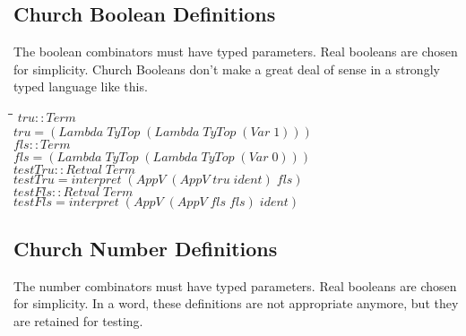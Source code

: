 \documentclass[10pt]{article}
\newlength{\lwidth}\setlength{\lwidth}{4.5cm}
\newlength{\cwidth}\setlength{\cwidth}{8mm} %
\newcommand{\Conid}[1]{\mathit{#1}}
\newcommand{\Varid}[1]{\mathit{#1}}
\begin{document}
\subsection{Church Boolean Definitions}

The boolean combinators must have typed parameters.  Real booleans are
chosen for simplicity.  Church Booleans don't make a great deal of
sense in a strongly typed language like this.

\begin{tabbing}
\qquad\=\hspace{\lwidth}\=\hspace{\cwidth}\=\+\kill
${\Varid{tru}\mathbin{::}\Conid{Term}}$\\
${\Varid{tru}\mathrel{=}(\Conid{Lambda}\;\Conid{TyTop}\;(\Conid{Lambda}\;\Conid{TyTop}\;(\Conid{Var}\;\mathrm{1})))}$\\
${\Varid{fls}\mathbin{::}\Conid{Term}}$\\
${\Varid{fls}\mathrel{=}(\Conid{Lambda}\;\Conid{TyTop}\;(\Conid{Lambda}\;\Conid{TyTop}\;(\Conid{Var}\;\mathrm{0})))}$\\
${}$\\
${\Varid{testTru}\mathbin{::}\Conid{Retval}\;\Conid{Term}}$\\
${\Varid{testTru}\mathrel{=}\Varid{interpret}\;(\Conid{AppV}\;(\Conid{AppV}\;\Varid{tru}\;\Varid{ident})\;\Varid{fls})}$\\
${}$\\
${\Varid{testFls}\mathbin{::}\Conid{Retval}\;\Conid{Term}}$\\
${\Varid{testFls}\mathrel{=}\Varid{interpret}\;(\Conid{AppV}\;(\Conid{AppV}\;\Varid{fls}\;\Varid{fls})\;\Varid{ident})}$
\end{tabbing}
\subsection{Church Number Definitions}

The number combinators must have typed parameters.  Real booleans are
chosen for simplicity.  In a word, these definitions are not appropriate
anymore, but they are retained for testing.
\end{document}

